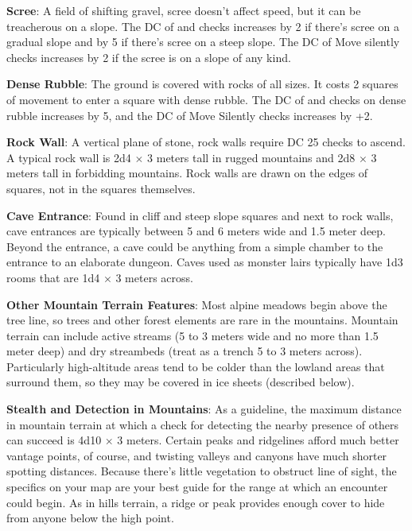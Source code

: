 \textbf{Scree}: A field of shifting gravel, scree doesn't affect speed, but it can be treacherous on a slope. The DC of  and  checks increases by 2 if there's scree on a gradual slope and by 5 if there's scree on a steep slope. The DC of Move silently checks increases by 2 if the scree is on a slope of any kind.

\textbf{Dense Rubble}: The ground is covered with rocks of all sizes. It costs 2 squares of movement to enter a square with dense rubble. The DC of  and  checks on dense rubble increases by 5, and the DC of Move Silently checks increases by +2.

\textbf{Rock Wall}: A vertical plane of stone, rock walls require DC 25  checks to ascend. A typical rock wall is 2d4 $\times$ 3 meters tall in rugged mountains and 2d8 $\times$ 3 meters tall in forbidding mountains. Rock walls are drawn on the edges of squares, not in the squares themselves.

\textbf{Cave Entrance}: Found in cliff and steep slope squares and next to rock walls, cave entrances are typically between 5 and 6 meters wide and 1.5 meter deep. Beyond the entrance, a cave could be anything from a simple chamber to the entrance to an elaborate dungeon. Caves used as monster lairs typically have 1d3 rooms that are 1d4 $\times$ 3 meters across.

\textbf{Other Mountain Terrain Features}: Most alpine meadows begin above the tree line, so trees and other forest elements are rare in the mountains. Mountain terrain can include active streams (5 to 3 meters wide and no more than 1.5 meter deep) and dry streambeds (treat as a trench 5 to 3 meters across). Particularly high-altitude areas tend to be colder than the lowland areas that surround them, so they may be covered in ice sheets (described below).

\textbf{Stealth and Detection in Mountains}: As a guideline, the maximum distance in mountain terrain at which a  check for detecting the nearby presence of others can succeed is 4d10 $\times$ 3 meters. Certain peaks and ridgelines afford much better vantage points, of course, and twisting valleys and canyons have much shorter spotting distances. Because there's little vegetation to obstruct line of sight, the specifics on your map are your best guide for the range at which an encounter could begin. As in hills terrain, a ridge or peak provides enough cover to hide from anyone below the high point.

